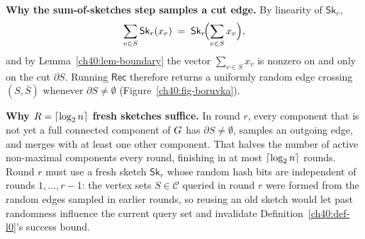 \begin{whybox}
\textbf{Why the sum-of-sketches step samples a cut edge.} By linearity of
$\mathsf{Sk}_r$,
\[
  \sum_{v\in S}\mathsf{Sk}_r(x_v) \;=\; \mathsf{Sk}_r\!\Bigl(\sum_{v\in S} x_v\Bigr),
\]
and by Lemma~\ref{ch40:lem-boundary} the vector $\sum_{v\in S} x_v$ is nonzero
on and only on the cut $\partial S$. Running $\mathsf{Rec}$ therefore returns a
uniformly random edge crossing $(S,\bar S)$ whenever $\partial S \neq \emptyset$
(Figure~\ref{ch40:fig-boruvka}).

\textbf{Why $R=\lceil\log_2 n\rceil$ fresh sketches suffice.} In round $r$, every
component that is not yet a full connected component of $G$ has
$\partial S \neq \emptyset$, samples an outgoing edge, and merges with at least
one other component. That halves the number of active non-maximal components
every round, finishing in at most $\lceil\log_2 n\rceil$ rounds. Round $r$ must use
a fresh sketch $\mathsf{Sk}_r$ whose random hash bits are independent of rounds
$1,\dots,r-1$: the vertex sets $S\in\mathcal{C}$ queried in round $r$ were
formed from the random edges sampled in earlier rounds, so reusing an old sketch
would let past randomness influence the current query set and invalidate
Definition~\ref{ch40:def-l0}'s success bound.
\end{whybox}

